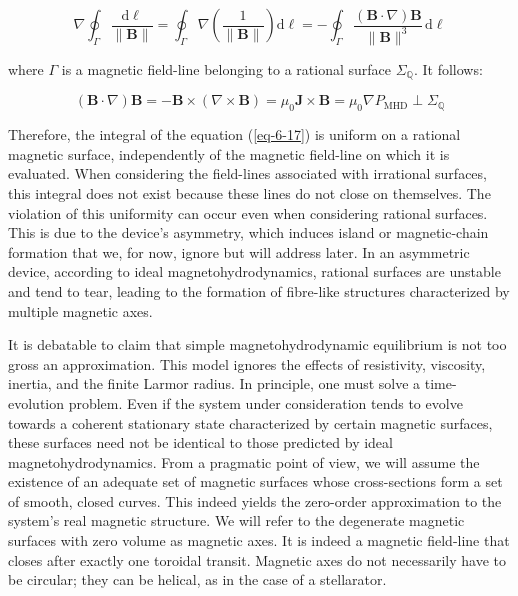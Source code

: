 \begin{equation}
    \label{eq-6-17}
    \nabla\oint_\Gamma\frac{\mathrm{d}\ell}{\|\mathbf{B}\|}=\oint_\Gamma\nabla\left(\frac{1}{\|\mathbf{B}\|}\right)\mathrm{d}\ell=-\oint_\Gamma\frac{(\mathbf{B}\cdot\nabla)\mathbf{B}}{\|\mathbf{B}\|^3}\,\mathrm{d}\ell
\end{equation}

where $\Gamma$ is a magnetic field-line belonging to a rational surface $\Sigma_\mathbb{Q}$. It follows:

\begin{equation}
    (\mathbf{B}\cdot\nabla)\mathbf{B}=-\mathbf{B}\times\left(\nabla\times\mathbf{B}\right)=\mu_0\mathbf{J}\times\mathbf{B}=\mu_0\nabla P_\text{MHD}\perp\Sigma_\mathbb{Q}
\end{equation}

Therefore, the integral of the equation (\ref{eq-6-17}) is uniform on a rational magnetic surface, independently of the magnetic field-line on which it is evaluated. When considering the field-lines associated with irrational surfaces, this integral does not exist because these lines do not close on themselves. The violation of this uniformity can occur even when considering rational surfaces. This is due to the device's asymmetry, which induces island or magnetic-chain formation that we, for now, ignore but will address later. In an asymmetric device, according to ideal magnetohydrodynamics, rational surfaces are unstable and tend to tear, leading to the formation of fibre-like structures characterized by multiple magnetic axes.

\quad It is debatable to claim that simple magnetohydrodynamic equilibrium is not too gross an approximation. This model ignores the effects of resistivity, viscosity, inertia, and the finite Larmor radius. In principle, one must solve a time-evolution problem. Even if the system under consideration tends to evolve towards a coherent stationary state characterized by certain magnetic surfaces, these surfaces need not be identical to those predicted by ideal magnetohydrodynamics. From a pragmatic point of view, we will assume the existence of an adequate set of magnetic surfaces whose cross-sections form a set of smooth, closed curves. This indeed yields the zero-order approximation to the system's real magnetic structure. We will refer to the degenerate magnetic surfaces with zero volume as magnetic axes. It is indeed a magnetic field-line that closes after exactly one toroidal transit. Magnetic axes do not necessarily have to be circular; they can be helical, as in the case of a stellarator.

